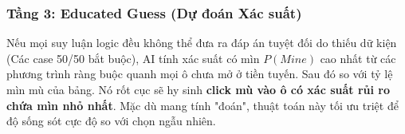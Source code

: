 \subsubsection{Tầng 3: Educated Guess (Dự đoán Xác suất)}
Nếu mọi suy luận logic đều không thể đưa ra đáp án tuyệt đối do thiếu dữ kiện (Các case 50/50 bắt buộc), AI tính xác suất có mìn $P(Mine)$ cao nhất từ các phương trình ràng buộc quanh mọi ô chưa mở ở tiền tuyến. Sau đó so với tỷ lệ mìn mù của bảng. Nó rốt cục sẽ hy sinh \textbf{click mù vào ô có xác suất rủi ro chứa mìn nhỏ nhất}. Mặc dù mang tính "đoán", thuật toán này tối ưu triệt để độ sống sót cực độ so với chọn ngẫu nhiên.
